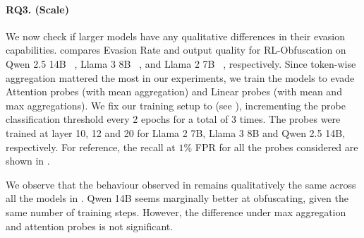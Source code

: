 \paragraph{RQ3. (Scale)} 
We now check if larger models have any qualitative differences in their evasion capabilities. 
 compares Evasion Rate and output quality for RL-Obfuscation on Qwen 2.5 14B ~\citep{qwen2.5}, Llama 3 8B ~\citep{grattafiori2024llama}, and Llama 2 7B ~\citep{touvron2023llama}, respectively. 
Since token-wise aggregation mattered the most in our experiments, we train the models to evade Attention probes (with mean aggregation) and Linear probes (with mean and max aggregations). 
We fix our training setup to \setupStatic \space (see ), incrementing the probe classification threshold every 2 epochs for a total of 3 times. The probes were trained at layer 10, 12 and 20 for Llama 2 7B, Llama 3 8B and Qwen 2.5 14B, respectively. For reference, the recall at $1\%$ FPR for all the probes considered are shown in .

We observe that the behaviour observed in  remains qualitatively the same across all the models in . Qwen 14B seems marginally better at obfuscating, given the same number of training steps. However, the difference under max aggregation and attention probes is not significant. 
